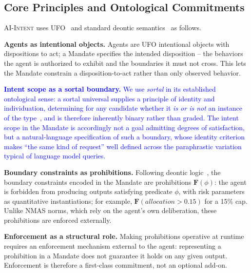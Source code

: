 \documentclass[runningheads]{llncs}
\begin{document}
\subsection{Core Principles and Ontological Commitments}
\label{sec:ontology}

\textsc{AI-Intent} uses UFO~\cite{guizzardi2005ontological} and
standard deontic
semantics~\cite{vonwright1951essay,governatori2005meeting} as follows. %

\textbf{Agents as intentional objects.} Agents are UFO intentional objects with dispositions to act; a Mandate specifies the intended disposition -- the behaviors the agent is authorized to exhibit and the boundaries it must not cross. This lets the Mandate constrain a disposition-to-act rather than only observed behavior.

\textcolor{blue}{\textbf{Intent scope as a sortal boundary.} We use \emph{sortal} in its
established ontological sense: a sortal universal supplies a principle of identity and individuation, determining for any candidate whether it \emph{is or is not} an instance of the type~\cite{guizzardi2005ontological}, and is therefore inherently binary rather than graded. The intent scope in the Mandate is accordingly not a goal admitting degrees of satisfaction, but a natural-language specification of such a boundary, whose identity criterion makes ``the same kind of request'' well defined across the paraphrastic variation typical of language model queries.}

\textbf{Boundary constraints as prohibitions.} Following deontic logic~\cite{vonwright1951essay}, the boundary constraints encoded in the Mandate are prohibitions $\mathbf{F}(\phi)$: the agent is
forbidden from producing outputs satisfying predicate $\phi$, with risk parameters as quantitative instantiations; for example, $\mathbf{F}(\mathit{allocation} > 0.15)$ for a 15\% cap. Unlike NMAS norms, which rely on the agent's own deliberation, these prohibitions are enforced externally.

\textbf{Enforcement as a structural role.} Making prohibitions operative at runtime requires an enforcement mechanism external to the agent: representing a prohibition in a Mandate does not guarantee it holds on any given output. Enforcement is therefore a first-class commitment, not an optional add-on.
\end{document}
